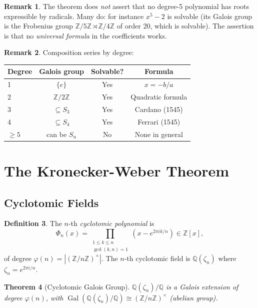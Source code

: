\documentclass[12pt,a4paper]{amsart}
\newtheorem{theorem}{Theorem}[section]
\theoremstyle{definition}
\newtheorem{definition}[theorem]{Definition}
\newtheorem{remark}[theorem]{Remark}
\newcommand{\Q}{\mathbb{Q}}
\newcommand{\Z}{\mathbb{Z}}
\newcommand{\Gal}{\operatorname{Gal}}
\begin{document}
\begin{remark}
The theorem does \emph{not} assert that no degree-5 polynomial has roots
expressible by radicals. Many do: for instance $x^5 - 2$ is solvable
(its Galois group is the Frobenius group $\Z/5\Z \rtimes \Z/4\Z$ of order 20,
which is solvable). The assertion is that no \emph{universal formula} in the
coefficients works.
\end{remark}

\begin{remark}
Composition series by degree:
\begin{center}
\begin{tabular}{lccc}
\toprule
Degree & Galois group & Solvable? & Formula \\
\midrule
1 & $\{e\}$ & Yes & $x = -b/a$ \\
2 & $\Z/2\Z$ & Yes & Quadratic formula \\
3 & $\subseteq S_3$ & Yes & Cardano (1545) \\
4 & $\subseteq S_4$ & Yes & Ferrari (1545) \\
$\geq 5$ & can be $S_n$ & No & None in general \\
\bottomrule
\end{tabular}
\end{center}
\end{remark}

\section{The Kronecker-Weber Theorem}

\subsection{Cyclotomic Fields}

\begin{definition}
The $n$-th \emph{cyclotomic polynomial} is
\[
  \Phi_n(x) = \prod_{\substack{1 \leq k \leq n \\ \gcd(k,n) = 1}} (x - e^{2\pi i k/n})
  \in \Z[x],
\]
of degree $\varphi(n) = |(\Z/n\Z)^\times|$. The $n$-th cyclotomic field is
$\Q(\zeta_n)$ where $\zeta_n = e^{2\pi i/n}$.
\end{definition}

\begin{theorem}[Cyclotomic Galois Group]
$\Q(\zeta_n)/\Q$ is a Galois extension of degree $\varphi(n)$, with
$\Gal(\Q(\zeta_n)/\Q) \cong (\Z/n\Z)^\times$
(abelian group).
\end{theorem}
\end{document}
